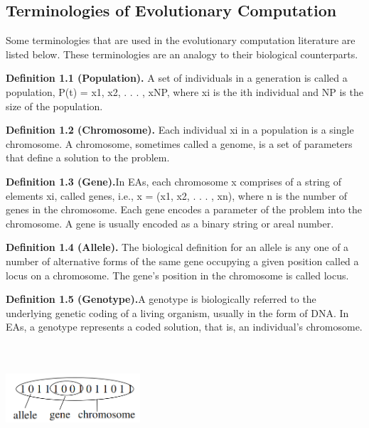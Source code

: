\documentclass[14pt]{article}
\numberwithin{equation}{subsection}
\begin{document}
		\subsection{Terminologies of Evolutionary Computation}
		Some terminologies that are used in the evolutionary computation literature are listed
		below. These terminologies are an analogy to their biological counterparts. \vspace{1mm}
		
		\noindent \textbf{Definition 1.1 (Population).} A set of individuals in a generation is called a population, 
		P(t) = x1, x2, . . . , xNP, where xi is the ith individual and NP is the size of the population. \vspace{2mm}
		
		\noindent \textbf{Definition 1.2 (Chromosome).} Each individual xi in a population is a single chromosome. A
		chromosome, sometimes called a genome, is a set of parameters that define a solution to the problem. \vspace{2mm}
		
		\noindent \textbf{Definition 1.3 (Gene).}In EAs, each chromosome x comprises of a string of elements xi,
		called genes,	i.e., x = (x1, x2, . . . , xn), where n is the number of genes in the	chromosome. Each gene
		encodes a parameter of the problem into the chromosome. A gene is usually encoded as a binary string or 
		areal number. \vspace{2mm}
			
		\noindent \textbf{Definition 1.4 (Allele).} The biological definition for an allele is any one of a number of
		alternative forms of the same gene occupying a given position called a locus on a chromosome. The gene’s
		position in the chromosome is called locus. \vspace{2mm}
		
		\noindent \textbf{Definition 1.5 (Genotype).}A genotype is biologically referred to the underlying genetic
		coding of a living organism, usually in the form of DNA. In EAs, a genotype represents a coded solution, that
		is, an individual’s chromosome. \vspace{2mm}
			
		\begin{center}
				\includegraphics[width=5cm, height=4cm]{Genotype.PNG}
		\end{center}
		
\end{document}

